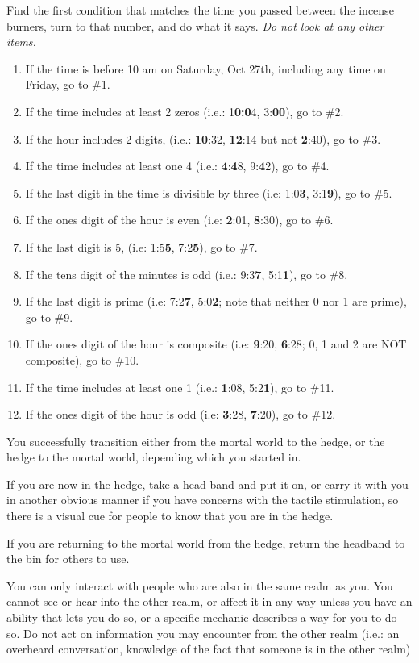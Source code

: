 \documentclass[white]{gl2018}
\begin{document}
Find the first condition that matches the time you passed between the incense burners, turn to that number, and do what it says. {\em Do not look at any other items.}
\begin{enumerate}
\item If the time is before 10 am on Saturday, Oct 27th, including any time on Friday, go to \#1.
\item 
If the time includes at least 2 zeros (i.e.: 1\textbf{0:0}4, 3:\textbf{00}), go to \#2.
\item If the hour includes 2 digits, (i.e.: \textbf{10}:32, \textbf{12}:14 but not \textbf{2}:40), go to \#3.
\item 
If the time includes at least one 4 (i.e.: \textbf{4}:\textbf{4}8, 9:\textbf{4}2), go to \#4.
\item 
If the last digit in the time is divisible by three (i.e: 1:0\textbf{3}, 3:1\textbf{9}), go to \#5.
\item
If the ones digit of the hour is even (i.e: \textbf{2}:01, \textbf{8}:30), go to \#6.
\item
If the last digit is 5, (i.e: 1:5\textbf{5}, 7:2\textbf{5}), go to \#7. 
\item If the tens digit of the minutes is odd (i.e.: 9:3\textbf{7}, 5:1\textbf{1}), go to \#8.
\item
If the last digit is prime (i.e: 7:2\textbf{7}, 5:0\textbf{2}; note that neither 0 nor 1 are prime), go to \#9.
\item If the ones digit of the hour is composite (i.e: \textbf{9}:20, \textbf{6}:28;  0, 1 and 2 are NOT composite), go to \#10.
\item If the time includes at least one 1 (i.e.: {\bf 1}:08, 5:2{\bf 1}), go to \#11.
\item If the ones digit of the hour is odd (i.e: {\bf 3}:28, {\bf 7}:20), go to \#12.
\end{enumerate}
\pagebreak
\begin{sect}{1}
You successfully transition either from the mortal world to the hedge, or the hedge to the mortal world, depending which you started in.

If you are now in the hedge, take a head band and put it on, or carry it with you in another obvious manner if you have concerns with the tactile stimulation, so there is a visual cue for people to know that you are in the hedge.

If you are returning to the mortal world from the hedge, return the headband to the bin for others to use.

You can only interact with people who are also in the same realm as you. You cannot see or hear into the other realm, or affect it in any way unless you have an ability that lets you do so, or a specific mechanic describes a way for you to do so. Do not act on information you may encounter from the other realm (i.e.: an overheard conversation, knowledge of the fact that someone is in the other realm)
\end{sect}
\end{document}
